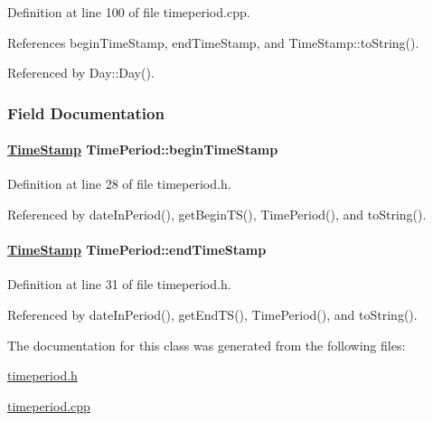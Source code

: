 Definition at line 100 of file timeperiod.cpp.

References begin\-Time\-Stamp, end\-Time\-Stamp, and Time\-Stamp::to\-String().

Referenced by Day::Day().

\subsubsection{Field Documentation}
\hypertarget{classTimePeriod_TimePeriodo0}{
\paragraph[beginTimeStamp]{\setlength{\rightskip}{0pt plus 5cm}\hyperlink{classTimeStamp}{Time\-Stamp} Time\-Period::begin\-Time\-Stamp}\hfill}
\label{classTimePeriod_TimePeriodo0}




Definition at line 28 of file timeperiod.h.

Referenced by date\-In\-Period(), get\-Begin\-TS(), Time\-Period(), and to\-String().\hypertarget{classTimePeriod_TimePeriodo1}{
\paragraph[endTimeStamp]{\setlength{\rightskip}{0pt plus 5cm}\hyperlink{classTimeStamp}{Time\-Stamp} Time\-Period::end\-Time\-Stamp}\hfill}
\label{classTimePeriod_TimePeriodo1}




Definition at line 31 of file timeperiod.h.

Referenced by date\-In\-Period(), get\-End\-TS(), Time\-Period(), and to\-String().

The documentation for this class was generated from the following files:\begin{CompactItemize}
\item 
\hyperlink{timeperiod_8h}{timeperiod.h}\item 
\hyperlink{timeperiod_8cpp}{timeperiod.cpp}\end{CompactItemize}

